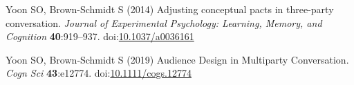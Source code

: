 \documentclass[
  english,
  a4paper,
]{article}
\newlength{\cslhangindent}
\newlength{\cslentryspacingunit} %
\newenvironment{CSLReferences}[2] %
 {%
  \setlength{\parindent}{0pt}
  \ifodd #1
  \let\oldpar\par
  \def\par{\hangindent=\cslhangindent\oldpar}
  \fi
  \setlength{\parskip}{#2\cslentryspacingunit}
 }%
 {}
\begin{document}
\begin{CSLReferences}{1}{0}
\leavevmode{}%
Yoon SO, Brown-Schmidt S (2014) Adjusting conceptual pacts in three-party conversation. \emph{Journal of Experimental Psychology: Learning, Memory, and Cognition} \textbf{40}:919--937. doi:\href{https://doi.org/10.1037/a0036161}{10.1037/a0036161}

\leavevmode{}%
Yoon SO, Brown‐Schmidt S (2019) Audience {Design} in {Multiparty Conversation}. \emph{Cogn Sci} \textbf{43}:e12774. doi:\href{https://doi.org/10.1111/cogs.12774}{10.1111/cogs.12774}

\end{CSLReferences}
\end{document}
